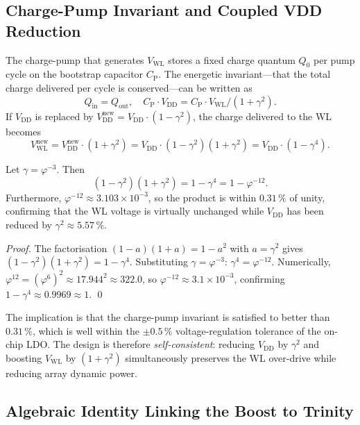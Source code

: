\subsection{Charge-Pump Invariant and Coupled VDD Reduction}

The charge-pump that generates $V_{\mathrm{WL}}$ stores a fixed charge
quantum $Q_{0}$ per pump cycle on the bootstrap capacitor $C_{\mathrm{P}}$.
The energetic invariant—that the total charge delivered per cycle is
conserved—can be written as
\[
  Q_{\mathrm{in}} = Q_{\mathrm{out}},
  \quad
  C_{\mathrm{P}} \cdot V_{\mathrm{DD}} = C_{\mathrm{P}} \cdot V_{\mathrm{WL}} / (1+\gamma^{2}).
\]
If $V_{\mathrm{DD}}$ is replaced by
$V_{\mathrm{DD}}^{\mathrm{new}} = V_{\mathrm{DD}} \cdot (1-\gamma^{2})$,
the charge delivered to the WL becomes
\[
  V_{\mathrm{WL}}^{\mathrm{new}}
  = V_{\mathrm{DD}}^{\mathrm{new}} \cdot (1+\gamma^{2})
  = V_{\mathrm{DD}} \cdot (1-\gamma^{2})(1+\gamma^{2})
  = V_{\mathrm{DD}} \cdot (1 - \gamma^{4}).
\]

\begin{lemma}
\label{lem:charge-pump}
Let $\gamma = \varphi^{-3}$.  Then
\[
  (1-\gamma^{2})(1+\gamma^{2}) = 1 - \gamma^{4} = 1 - \varphi^{-12}.
\]
Furthermore, $\varphi^{-12} \approx 3.103 \times 10^{-3}$, so the
product is within $0.31\,\%$ of unity, confirming that the WL voltage
is virtually unchanged while $V_{\mathrm{DD}}$ has been reduced by
$\gamma^{2} \approx 5.57\,\%$.
\end{lemma}

\begin{proof}
The factorisation $(1-a)(1+a) = 1 - a^{2}$ with $a = \gamma^{2}$ gives
$(1-\gamma^{2})(1+\gamma^{2}) = 1 - \gamma^{4}$.
Substituting $\gamma = \varphi^{-3}$: $\gamma^{4} = \varphi^{-12}$.
Numerically, $\varphi^{12} = (\varphi^{6})^{2} \approx 17.944^{2}
\approx 322.0$, so $\varphi^{-12} \approx 3.1 \times 10^{-3}$, confirming
$1 - \gamma^{4} \approx 0.9969 \approx 1$.  \qed
\end{proof}

The implication is that the charge-pump invariant is satisfied to
better than $0.31\,\%$, which is well within the $\pm 0.5\,\%$
voltage-regulation tolerance of the on-chip LDO.  The design is
therefore \emph{self-consistent}: reducing $V_{\mathrm{DD}}$ by
$\gamma^{2}$ and boosting $V_{\mathrm{WL}}$ by $(1+\gamma^{2})$
simultaneously preserves the WL over-drive while reducing array
dynamic power.

\subsection{Algebraic Identity Linking the Boost to Trinity}

